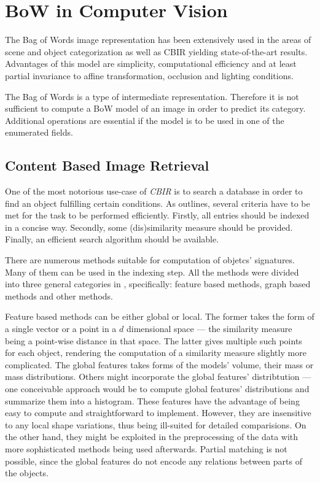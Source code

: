 \documentclass[a4paper,12pt]{article}
\begin{document}
\section{BoW in Computer Vision}

  The Bag of Words image representation has been extensively used in the areas of scene \cite{csurka2004visual,fei2005bayesian, tsai2012bag} and object categorization \cite{zhangcategory} as well as CBIR \cite{li2010investigating,toldo2009bag} yielding state-of-the-art results. Advantages of this model are simplicity, computational efficiency and at least partial invariance to affine transformation, occlusion and lighting conditions. 
  
  The Bag of Words is a type of intermediate representation. Therefore it is not sufficient to compute a BoW model of an image in order to predict its category. Additional operations are essential if the model is to be used in one of the enumerated fields.
  
  \subsection{Content Based Image Retrieval}
  
  One of the most notorious use-case of \emph{CBIR} is to search a database in order to find an object fulfilling certain conditions. As \cite{toldo2009bag} outlines, several criteria have to be met for the task to be performed efficiently. Firstly, all entries should be indexed in a concise way. Secondly, some (dis)similarity measure should be provided. Finally, an efficient search algorithm should be available.  
    
  There are numerous methods suitable for computation of objetcs' signatures. Many of them can be used in the indexing step. All the methods were divided into three general categories in \cite{toldo2009bag}, specifically: feature based methods, graph based methods and other methods. 
   
  Feature based methods can be either global or local. The former takes the form of a single vector or a point in a $d$ dimensional space --- the similarity measure being a point-wise distance in that space. The latter gives multiple such points for each object, rendering the computation of a similarity measure slightly more complicated. The global features takes forms of the models' volume, their mass or mass distributions. Others might incorporate the global features' distribtution --- one conceivable approach would be to compute global features' distributions and summarize them into a histogram. These features have the advantage of being easy to compute and straightforward to implement. However, they are insensitive to any local shape variations, thus being ill-suited for detailed comparisions. On the other hand, they might be exploited in the preprocessing of the data with more sophisticated methods being used afterwards. Partial matching is not possible, since the global features do not encode any relations between parts of the objects.
   
\end{document}
